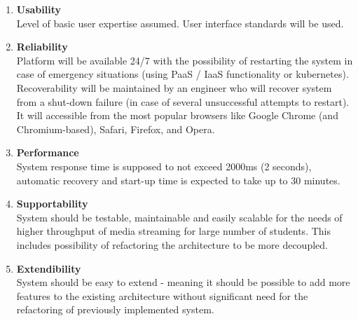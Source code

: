 \documentclass[a4paper,11pt,twoside]{report}
\theoremstyle{definition}
\begin{document}
\begin{enumerate}
\itemsep0em 
    \item \textbf{Usability} \\
     Level of basic user expertise assumed. User interface standards will be used.
    \item \textbf{Reliability} \\
      Platform will be available 24/7 with the possibility of restarting the system in case of emergency situations (using PaaS / IaaS functionality or kubernetes). Recoverability will be maintained by an engineer who will recover system from a shut-down failure (in case of several unsuccessful attempts to restart). It will accessible from the most popular browsers like Google Chrome (and Chromium-based), Safari, Firefox, and Opera.

    \item \textbf{Performance} \\
     System response time is supposed to not exceed 2000ms (2 seconds), automatic recovery and start-up time is expected to take up to 30 minutes. 
     
    \item \textbf{Supportability} \\
     System should be testable, maintainable and easily scalable for the needs of higher throughput of media streaming for large number of students. This includes possibility of refactoring the architecture to be more decoupled. 
     
     \item \textbf{Extendibility} \\ 
     System should be easy to extend - meaning it should be possible to add more features to the existing architecture without significant need for the refactoring of previously implemented system. 
     
\end{enumerate}
\end{document}
